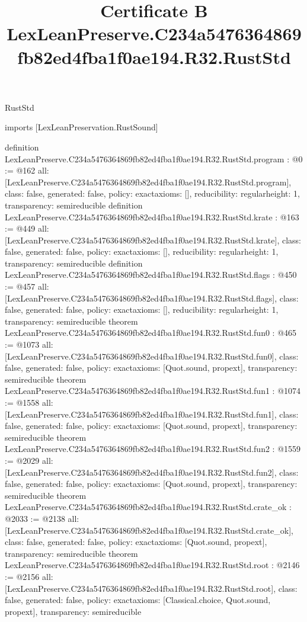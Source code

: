 \begin{lexlean}{RustStd}
\title{Certificate B LexLeanPreserve.C234a5476364869fb82ed4fba1f0ae194.R32.RustStd}
\begin{coremodule}
imports [LexLeanPreservation.RustSound]

definition LexLeanPreserve.C234a5476364869fb82ed4fba1f0ae194.R32.RustStd.program : @0 := @162 {
  all: [LexLeanPreserve.C234a5476364869fb82ed4fba1f0ae194.R32.RustStd.program],
  class: false,
  generated: false,
  policy: exact{axioms: []},
  reducibility: regular{height: 1},
  transparency: semireducible
}
definition LexLeanPreserve.C234a5476364869fb82ed4fba1f0ae194.R32.RustStd.krate : @163 := @449 {
  all: [LexLeanPreserve.C234a5476364869fb82ed4fba1f0ae194.R32.RustStd.krate],
  class: false,
  generated: false,
  policy: exact{axioms: []},
  reducibility: regular{height: 1},
  transparency: semireducible
}
definition LexLeanPreserve.C234a5476364869fb82ed4fba1f0ae194.R32.RustStd.flags : @450 := @457 {
  all: [LexLeanPreserve.C234a5476364869fb82ed4fba1f0ae194.R32.RustStd.flags],
  class: false,
  generated: false,
  policy: exact{axioms: []},
  reducibility: regular{height: 1},
  transparency: semireducible
}
theorem LexLeanPreserve.C234a5476364869fb82ed4fba1f0ae194.R32.RustStd.fun0 : @465 := @1073 {
  all: [LexLeanPreserve.C234a5476364869fb82ed4fba1f0ae194.R32.RustStd.fun0],
  class: false,
  generated: false,
  policy: exact{axioms: [Quot.sound, propext]},
  transparency: semireducible
}
theorem LexLeanPreserve.C234a5476364869fb82ed4fba1f0ae194.R32.RustStd.fun1 : @1074 := @1558 {
  all: [LexLeanPreserve.C234a5476364869fb82ed4fba1f0ae194.R32.RustStd.fun1],
  class: false,
  generated: false,
  policy: exact{axioms: [Quot.sound, propext]},
  transparency: semireducible
}
theorem LexLeanPreserve.C234a5476364869fb82ed4fba1f0ae194.R32.RustStd.fun2 : @1559 := @2029 {
  all: [LexLeanPreserve.C234a5476364869fb82ed4fba1f0ae194.R32.RustStd.fun2],
  class: false,
  generated: false,
  policy: exact{axioms: [Quot.sound, propext]},
  transparency: semireducible
}
theorem LexLeanPreserve.C234a5476364869fb82ed4fba1f0ae194.R32.RustStd.crate_ok : @2033 := @2138 {
  all: [LexLeanPreserve.C234a5476364869fb82ed4fba1f0ae194.R32.RustStd.crate_ok],
  class: false,
  generated: false,
  policy: exact{axioms: [Quot.sound, propext]},
  transparency: semireducible
}
theorem LexLeanPreserve.C234a5476364869fb82ed4fba1f0ae194.R32.RustStd.root : @2146 := @2156 {
  all: [LexLeanPreserve.C234a5476364869fb82ed4fba1f0ae194.R32.RustStd.root],
  class: false,
  generated: false,
  policy: exact{axioms: [Classical.choice, Quot.sound, propext]},
  transparency: semireducible
}


\end{coremodule}
\end{lexlean}
